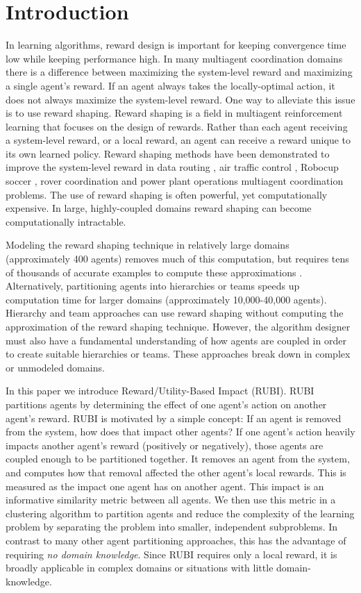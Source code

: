 \documentclass[smallcondensed]{svjour3}
\begin{document}
\section{Introduction}
In learning algorithms, reward design is important for keeping convergence time low while keeping performance high. In many multiagent coordination domains there is a difference between maximizing the system-level reward and maximizing a single agent's reward. If an agent always takes the locally-optimal action, it does not always maximize the system-level reward. One way to alleviate this issue is to use reward shaping. Reward shaping is a field in multiagent reinforcement learning that focuses on the design of rewards. Rather than each agent receiving a system-level reward, or a local reward, an agent can receive a reward unique to its own learned policy. Reward shaping methods have been demonstrated to improve the system-level reward in data routing \cite{tumer-wolpert_jair02}, air traffic control \cite{tumer-agogino_jaamas12}, Robocup soccer \cite{AAMAS12-agmon}, rover coordination \cite{5509316} and power plant operations \cite{Colby:2012:SFF:2343576.2343637} multiagent coordination problems. The use of reward shaping is often powerful, yet computationally expensive. In large, highly-coupled domains reward shaping can become computationally intractable. 

Modeling the reward shaping technique in relatively large domains (approximately 400 agents) removes much of this computation, but requires tens of thousands of accurate examples to compute these approximations \cite{Proper:2012:MDR:2343896.2344025}. Alternatively, partitioning agents into hierarchies \cite{tumer-holmesparker_ala12} or teams \cite{Curran:2013:AHC:2484920.2485183} speeds up computation time for larger domains (approximately 10,000-40,000 agents). Hierarchy and team approaches can use reward shaping without computing the approximation of the reward shaping technique. However, the algorithm designer must also have a fundamental understanding of how agents are coupled in order to create suitable hierarchies or teams. These approaches break down in complex or unmodeled domains.


In this paper we introduce Reward/Utility-Based Impact (RUBI). RUBI partitions agents by determining the effect of one agent's action on another agent's reward. RUBI is motivated by a simple concept: If an agent is removed from the system, how does that impact other agents? If one agent's action heavily impacts another agent's reward (positively or negatively), those agents are coupled enough to be partitioned together. It removes an agent from the system, and computes how that removal affected the other agent's local rewards. This is measured as the impact one agent has on another agent. This impact is an informative similarity metric between all agents. We then use this metric in a clustering algorithm to partition agents and reduce the complexity of the learning problem by separating the problem into smaller, independent subproblems. In contrast to many other agent partitioning approaches, this has the advantage of requiring \textit{no domain knowledge}. Since RUBI requires only a local reward, it is broadly applicable in complex domains or situations with little domain-knowledge.
\end{document}
